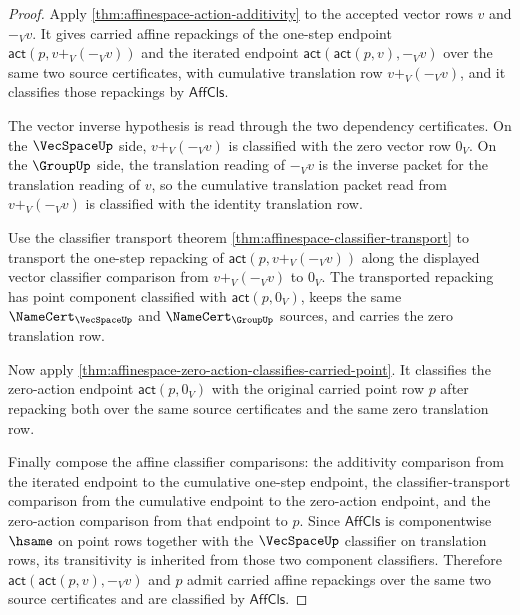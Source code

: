 \begin{proof}
Apply \autoref{thm:affinespace-action-additivity} to the accepted vector rows $v$ and $-_V v$. It gives carried affine repackings of the one-step endpoint $\mathsf{act}(p,v+_V(-_V v))$ and the iterated endpoint $\mathsf{act}(\mathsf{act}(p,v),-_V v)$ over the same two source certificates, with cumulative translation row $v+_V(-_V v)$, and it classifies those repackings by $\mathsf{AffCls}$.

The vector inverse hypothesis is read through the two dependency certificates. On the $\VecSpaceUp$ side, $v+_V(-_V v)$ is classified with the zero vector row $0_V$. On the $\GroupUp$ side, the translation reading of $-_V v$ is the inverse packet for the translation reading of $v$, so the cumulative translation packet read from $v+_V(-_V v)$ is classified with the identity translation row.

Use the classifier transport theorem \autoref{thm:affinespace-classifier-transport} to transport the one-step repacking of $\mathsf{act}(p,v+_V(-_V v))$ along the displayed vector classifier comparison from $v+_V(-_V v)$ to $0_V$. The transported repacking has point component classified with $\mathsf{act}(p,0_V)$, keeps the same $\NameCert_{\VecSpaceUp}$ and $\NameCert_{\GroupUp}$ sources, and carries the zero translation row.

Now apply \autoref{thm:affinespace-zero-action-classifies-carried-point}. It classifies the zero-action endpoint $\mathsf{act}(p,0_V)$ with the original carried point row $p$ after repacking both over the same source certificates and the same zero translation row.

Finally compose the affine classifier comparisons: the additivity comparison from the iterated endpoint to the cumulative one-step endpoint, the classifier-transport comparison from the cumulative endpoint to the zero-action endpoint, and the zero-action comparison from that endpoint to $p$. Since $\mathsf{AffCls}$ is componentwise $\hsame$ on point rows together with the $\VecSpaceUp$ classifier on translation rows, its transitivity is inherited from those two component classifiers. Therefore $\mathsf{act}(\mathsf{act}(p,v),-_V v)$ and $p$ admit carried affine repackings over the same two source certificates and are classified by $\mathsf{AffCls}$.
\end{proof}
